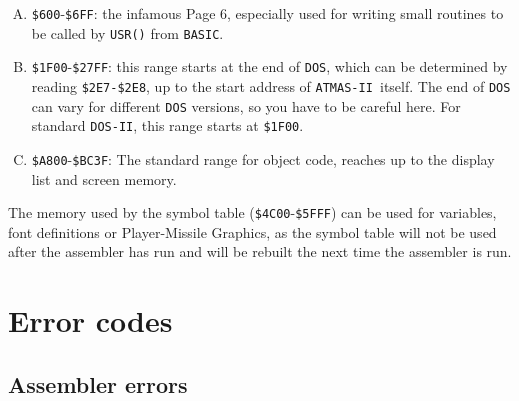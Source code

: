\documentclass[10pt,a4paper,twoside,final,openright,titlepage]{memoir}
\def\atmas{\texttt{AT\-MAS-II }}
\begin{document}
\begin{enumerate}[A)]
\item \texttt{\$600}-\texttt{\$6FF}: the infamous Page 6, especially used for
	writing small routines to be called by \texttt{USR()} from \texttt{BASIC}.

\item \texttt{\$1F00}-\texttt{\$27FF}: this range starts at the end of \texttt{DOS}, which
	can be determined by reading \texttt{\$2E7-\$2E8}, up to the start address of \atmas itself.
	The end of \texttt{DOS} can vary for different \texttt{DOS} versions, so you have to be careful here.
	For standard \texttt{DOS-II}, this range starts at \texttt{\$1F00}.

\item \texttt{\$A800}-\texttt{\$BC3F}: The standard range for object code,
	reaches up to the display list and screen memory.
\end{enumerate}

The memory used by the symbol table (\texttt{\$4C00}-\texttt{\$5FFF}) can be
used for variables, font definitions or Player-Missile Graphics, as the symbol table will not be
used after the assembler has run and will be rebuilt the next time the assembler is run.

\chapter{Error codes}

\section{Assembler errors}
\end{document}
